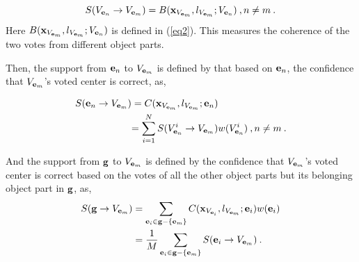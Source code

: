 \[
S({V_{{{\bf{e}}_n}}} \to {V_{{{\bf{e}}_m}}})  =  B({\bf{x}}_{V_{{{\bf{e}}_m}}},l_{V_{{{\bf{e}}_m}}};{V_{{{\bf{e}}_n}}})\:,n \ne m\:.
\]
Here $B({\bf{x}}_{V_{{{\bf{e}}_m}}},l_{V_{{{\bf{e}}_m}}};{V_{{{\bf{e}}_n}}})$ is defined in (\ref{eq2}). This measures the coherence of the two votes from different object parts.

Then, the support from ${{\bf{e}}_n}$ to ${V_{{{\bf{e}}_m}}}$ is defined by that based on ${{\bf{e}}_n}$, the confidence that $V_{{{\bf{e}}_m}}$'s voted center is correct, as,

\[
\begin{aligned}
S({{{\bf{e}}_n} \to {V_{{{\bf{e}}_m}}}}) &= C({\bf{x}}_{V_{{{\bf{e}}_m}}},l_{V_{{{\bf{e}}_m}}};{{{\bf{e}}_n}})\\
& {
=\sum\limits^N_{i=1} {S({{V^i_{{{\bf{e}}_n}}} \to {V_{{{\bf{e}}_m}}}})w(V^i_{{\bf{e}}_n})}\:,n \ne m\:.
}
\end{aligned}
\]

And the support from ${\bf{g}}$ to $V_{{\bf{e}}_m}$ is defined by the confidence that $V_{{\bf{e}}_m}$'s voted center is correct based on the votes of all the other object parts but its belonging object part in $\bf{g}$, as,
\[
\begin{aligned}
S({\bf{g}} \to V_{{\bf{e}}_m})
&= \sum\limits_{{{\bf{e}}_i} \in {\bf{g}}- \{ {{\bf{e}}_m} \} }{C({\bf{x}}_{V_{{{\bf{e}}_i}}},l_{V_{{{\bf{e}}_m}}};{{{\bf{e}}_i}})w({{\bf{e}}_i})}\\
& =\frac 1 M  \sum\limits_{{{\bf{e}}_i} \in {\bf{g}}- \{ {{\bf{e}}_m} \}} {S({{{\bf{e}}_i} \to {V_{{{\bf{e}}_m}}}})} \:.
\end{aligned}
\]

